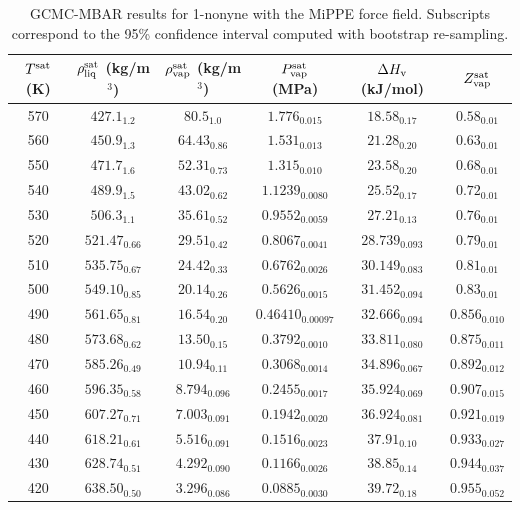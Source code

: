 \documentclass[journal=jctc,manuscript=article]{achemso}
\begin{document}
\begin{table}[htb!]
	\caption{GCMC-MBAR results for 1-nonyne with the MiPPE force field. Subscripts correspond to the 95\% confidence interval computed with bootstrap re-sampling.}
	\begin{center}
		\begin{tabular}{|c|c|c|c|c|c|}
			\hline
			$T^{\rm sat}$ (K) & $\rho_{\rm liq}^{\rm sat}$ (kg/m$^3$) & $\rho_{\rm vap}^{\rm sat}$ (kg/m$^3$) & $P_{\rm vap}^{\rm sat}$ (MPa) & $\Delta H_{\rm v}$ (kJ/mol) & $Z_{\rm vap}^{\rm sat}$ \\ \hline
			570 & $427.1_{1.2}$ & $80.5_{1.0}$ & $1.776_{0.015}$ & $18.58_{0.17}$ & $0.58_{0.01}$ \\
			560 & $450.9_{1.3}$ & $64.43_{0.86}$ & $1.531_{0.013}$ & $21.28_{0.20}$ & $0.63_{0.01}$ \\
			550 & $471.7_{1.6}$ & $52.31_{0.73}$ & $1.315_{0.010}$ & $23.58_{0.20}$ & $0.68_{0.01}$ \\
			540 & $489.9_{1.5}$ & $43.02_{0.62}$ & $1.1239_{0.0080}$ & $25.52_{0.17}$ & $0.72_{0.01}$ \\
			530 & $506.3_{1.1}$ & $35.61_{0.52}$ & $0.9552_{0.0059}$ & $27.21_{0.13}$ & $0.76_{0.01}$ \\
			520 & $521.47_{0.66}$ & $29.51_{0.42}$ & $0.8067_{0.0041}$ & $28.739_{0.093}$ & $0.79_{0.01}$ \\
			510 & $535.75_{0.67}$ & $24.42_{0.33}$ & $0.6762_{0.0026}$ & $30.149_{0.083}$ & $0.81_{0.01}$ \\
			500 & $549.10_{0.85}$ & $20.14_{0.26}$ & $0.5626_{0.0015}$ & $31.452_{0.094}$ & $0.83_{0.01}$ \\
			490 & $561.65_{0.81}$ & $16.54_{0.20}$ & $0.46410_{0.00097}$ & $32.666_{0.094}$ & $0.856_{0.010}$ \\
			480 & $573.68_{0.62}$ & $13.50_{0.15}$ & $0.3792_{0.0010}$ & $33.811_{0.080}$ & $0.875_{0.011}$ \\
			470 & $585.26_{0.49}$ & $10.94_{0.11}$ & $0.3068_{0.0014}$ & $34.896_{0.067}$ & $0.892_{0.012}$ \\
			460 & $596.35_{0.58}$ & $8.794_{0.096}$ & $0.2455_{0.0017}$ & $35.924_{0.069}$ & $0.907_{0.015}$ \\
			450 & $607.27_{0.71}$ & $7.003_{0.091}$ & $0.1942_{0.0020}$ & $36.924_{0.081}$ & $0.921_{0.019}$ \\
			440 & $618.21_{0.61}$ & $5.516_{0.091}$ & $0.1516_{0.0023}$ & $37.91_{0.10}$ & $0.933_{0.027}$ \\
			430 & $628.74_{0.51}$ & $4.292_{0.090}$ & $0.1166_{0.0026}$ & $38.85_{0.14}$ & $0.944_{0.037}$ \\
			420 & $638.50_{0.50}$ & $3.296_{0.086}$ & $0.0885_{0.0030}$ & $39.72_{0.18}$ & $0.955_{0.052}$ \\
			\hline
		\end{tabular}
	\end{center}
\end{table}
\end{document}
